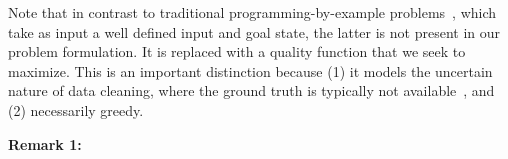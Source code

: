     Note that in contrast to traditional programming-by-example problems~\cite{}, which take as input a well defined input and goal state, the latter is not present in our problem formulation.  It is replaced with a quality function that we seek to maximize.  This is an important distinction because (1) it models the uncertain nature of data cleaning, where the ground truth is typically not available~\cite{}, and (2) necessarily greedy.

    \vspace{0.5em} \noindent \textbf{Remark 1: } 



\fi







